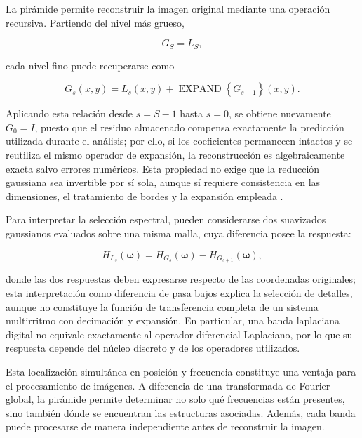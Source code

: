 La pirámide permite reconstruir la imagen original mediante una operación recursiva. Partiendo del nivel más grueso,

\begin{equation}
    G_S=L_S,
\end{equation}

cada nivel fino puede recuperarse como

\begin{equation}
    G_s(x,y)
    =
    L_s(x,y)
    +
    \operatorname{EXPAND}
    \left\{
        G_{s+1}
    \right\}(x,y).
    \label{eq:reconstruccion_laplaciana}
\end{equation}

Aplicando esta relación desde $s=S-1$ hasta $s=0$, se obtiene nuevamente $G_0=I$, puesto que el residuo almacenado compensa exactamente la predicción utilizada durante el análisis; por ello, si los coeficientes permanecen intactos y se reutiliza el mismo operador de expansión, la reconstrucción es algebraicamente exacta salvo errores numéricos. Esta propiedad no exige que la reducción gaussiana sea invertible por sí sola, aunque sí requiere consistencia en las dimensiones, el tratamiento de bordes y la expansión empleada \cite{burt1983laplacian}.

Para interpretar la selección espectral, pueden considerarse dos suavizados gaussianos evaluados sobre una misma malla, cuya diferencia posee la respuesta:

\begin{equation}
    H_{L_s}(\boldsymbol{\omega})
    =
    H_{G_s}(\boldsymbol{\omega})
    -
    H_{G_{s+1}}(\boldsymbol{\omega}),
    \label{eq:respuesta_laplaciana}
\end{equation}

donde las dos respuestas deben expresarse respecto de las coordenadas originales; esta interpretación como diferencia de pasa bajos explica la selección de detalles, aunque no constituye la función de transferencia completa de un sistema multirritmo con decimación y expansión. En particular, una banda laplaciana digital no equivale exactamente al operador diferencial Laplaciano, por lo que su respuesta depende del núcleo discreto y de los operadores utilizados.

Esta localización simultánea en posición y frecuencia constituye una ventaja para el procesamiento de imágenes. A diferencia de una transformada de Fourier global, la pirámide permite determinar no solo qué frecuencias están presentes, sino también dónde se encuentran las estructuras asociadas. Además, cada banda puede procesarse de manera independiente antes de reconstruir la imagen.

